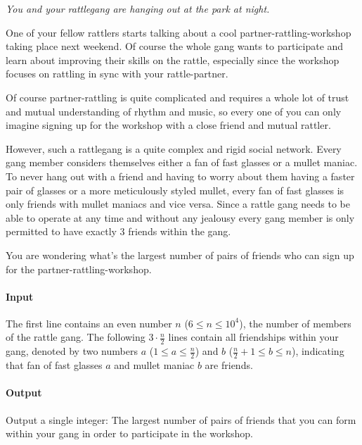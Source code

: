 



\makeheader

\textmusicalnote
\emph{You and your rattlegang are hanging out at the park at night.}
\textmusicalnote

One of your fellow rattlers starts talking about a cool partner-rattling-workshop taking place next weekend.
Of course the whole gang wants to participate and learn about improving their skills on the rattle,
especially since the workshop focuses on rattling in sync with your rattle-partner. 

Of course partner-rattling is quite complicated and requires a whole lot of trust and mutual understanding of rhythm and music,
so every one of you can only imagine signing up for the workshop with a close friend and mutual rattler. 

However, such a rattlegang is a quite complex and rigid social network.
Every gang member considers themselves either a fan of fast glasses or a mullet maniac.
To never hang out with a friend and having to worry about them having a faster pair of glasses or a more meticulously styled mullet,
every fan of fast glasses is only friends with mullet maniacs and vice versa.
Since a rattle gang needs to be able to operate at any time and without any jealousy every gang member is only permitted to have exactly 3 friends within the gang.

You are wondering what's the largest number of pairs of friends who can sign up for the partner-rattling-workshop. 

\paragraph*{Input}

The first line contains an even number $n$ ($6 \leq n \leq 10^4$), the number of members of the rattle gang.
The following $3 \cdot \frac{n}{2}$ lines contain all friendships within your gang, denoted by two numbers $a$ ($1 \leq a \leq \frac{n}{2}$) and $b$ ($\frac{n}{2} + 1 \leq b \leq n$), indicating that fan of fast glasses $a$ and mullet maniac $b$ are friends.

\paragraph*{Output}

Output a single integer: The largest number of pairs of friends that you can form within your gang in order to participate in the workshop. 

\begin{samples}
\end{samples}


